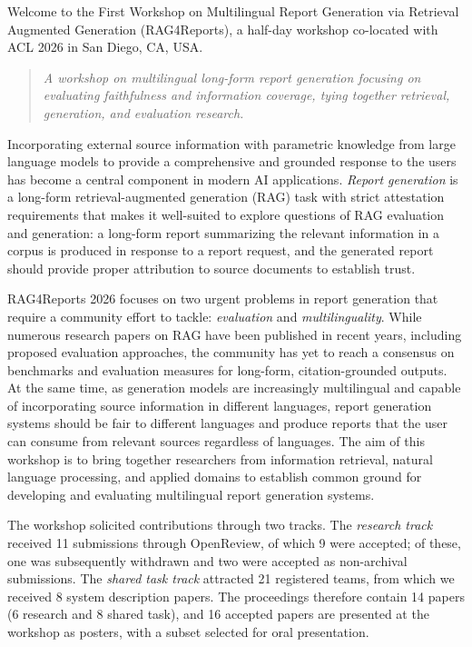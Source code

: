 
Welcome to the First Workshop on Multilingual Report Generation via
Retrieval Augmented Generation (RAG4Reports), a half-day workshop
co-located with ACL 2026 in San Diego, CA, USA.

\begin{quote}
\textit{A workshop on multilingual long-form report generation focusing on
evaluating faithfulness and information coverage, tying together retrieval,
generation, and evaluation research.}
\end{quote}

Incorporating external source information with parametric knowledge from large
language models to provide a comprehensive and grounded response to the users has
become a central component in modern AI applications.
\emph{Report generation} is a long-form
retrieval-augmented generation (RAG) task with strict attestation requirements
that makes it well-suited to explore questions of RAG evaluation and generation:
a long-form report summarizing the relevant information in a corpus is produced in
response to a report request, and the generated report should provide
proper attribution to source documents to establish trust.

RAG4Reports 2026 focuses on two urgent problems in report generation that
require a community effort to tackle: \emph{evaluation} and
\emph{multilinguality}. While numerous research papers on RAG have been
published in recent years, including proposed evaluation approaches, the
community has yet to reach a consensus on benchmarks and evaluation
measures for long-form, citation-grounded outputs. At the same time, as
generation models are increasingly multilingual and capable of incorporating
source information in different languages, report generation systems
should be fair to different languages and produce reports that the user can consume 
from relevant sources regardless of languages. The aim of this workshop is to bring
together researchers from information retrieval, natural language
processing, and applied domains to establish common ground for developing
and evaluating multilingual report generation systems.

The workshop solicited contributions through two tracks. The \emph{research
track} received 11 submissions through OpenReview, of which 9 were
accepted; of these, one was subsequently withdrawn and two were accepted as
non-archival submissions. The \emph{shared task track} attracted 21
registered teams, from which we received 8 system description papers. The
proceedings therefore contain 14 papers (6 research and 8 shared task), and
16 accepted papers are presented at the workshop as posters, with a subset
selected for oral presentation.

